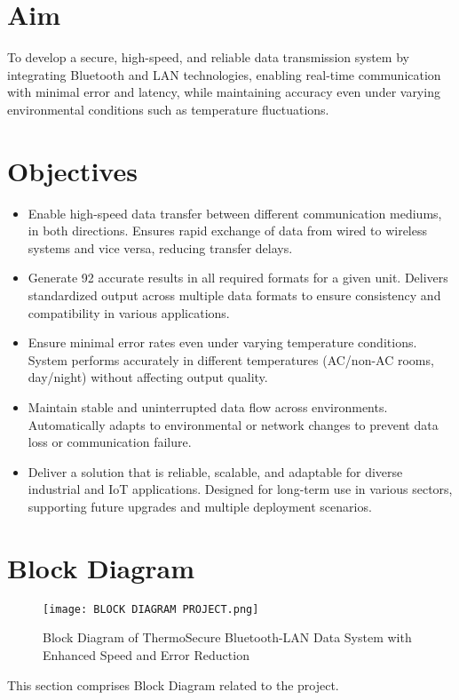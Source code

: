 \documentclass[12pt]{report}
\begin{document}
\section{Aim}
\begin{flushleft}
To develop a secure, high-speed, and reliable data transmission system by integrating Bluetooth and LAN technologies, enabling real-time communication with minimal error and latency, while maintaining accuracy even under varying environmental conditions such as temperature fluctuations.
\end{flushleft}

\section{Objectives}
\begin{flushleft}
\begin{itemize}[leftmargin=*]
    \item Enable high-speed data transfer between different communication mediums, in both directions. Ensures rapid exchange of data from wired to wireless systems and vice versa, reducing transfer delays.
    \item Generate 92 accurate results in all required formats for a given unit. Delivers standardized output across multiple data formats to ensure consistency and compatibility in various applications.
    \item Ensure minimal error rates even under varying temperature conditions. System performs accurately in different temperatures (AC/non-AC rooms, day/night) without affecting output quality.
    \item Maintain stable and uninterrupted data flow across environments. Automatically adapts to environmental or network changes to prevent data loss or communication failure.
    \item Deliver a solution that is reliable, scalable, and adaptable for diverse industrial and IoT applications. Designed for long-term use in various sectors, supporting future upgrades and multiple deployment scenarios.
\end{itemize}
\end{flushleft}

\clearpage
{\raggedright
\section{Block Diagram}
}
\begin{figure}[ht]
    \centering
    \texttt{[image: BLOCK DIAGRAM PROJECT.png]}
    \caption{Block Diagram of ThermoSecure Bluetooth-LAN Data System with Enhanced Speed and Error Reduction}
    \label{fig:block_diagram}
\end{figure}
\begin{flushleft}
This section comprises Block Diagram related to the project.
\end{flushleft}
\end{document}
